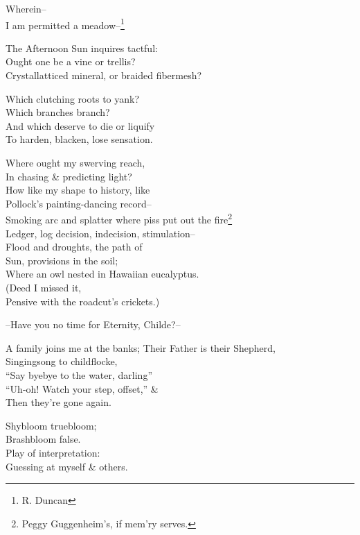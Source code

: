 \secdiv

Wherein-- \\
I am permitted a meadow--\footnote{R. Duncan}

The Afternoon Sun inquires tactful: \\
Ought one be a vine or trellis? \\
Crystallatticed mineral, or braided fibermesh?

Which clutching roots to yank? \\
Which branches branch? \\
And which deserve to die or liquify \\
To harden, blacken, lose sensation.

Where ought my swerving reach, \\
In chasing \& predicting light? \\
How like my shape to history, like \\
Pollock's painting-dancing record-- \\
Smoking arc and splatter where piss put out the fire\footnote{Peggy Guggenheim's, if mem'ry serves.} \\

Ledger, log decision, indecision, stimulation-- \\
Flood and droughts, the path of \\
Sun, provisions in the soil; \\
Where an owl nested in Hawaiian eucalyptus. \\
(Deed I missed it, \\
Pensive with the roadcut's crickets.)

\secdiv

--Have you no time for Eternity, Childe?--

A family joins me at the banks;
Their Father is their Shepherd, \\
Singingsong to childflocke, \\
``Say byebye to the water, darling''\\
``Uh-oh! Watch your step, offset,'' \& \\
Then they're gone again.

Shybloom truebloom; \\
Brashbloom false. \\
Play of interpretation: \\
Guessing at myself \& others.

